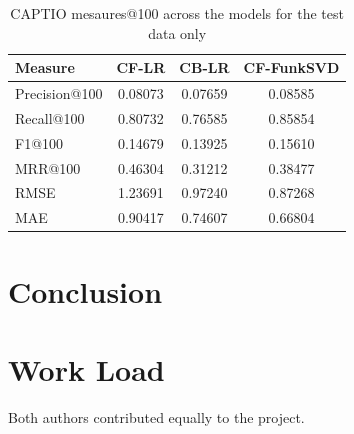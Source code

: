 \documentclass[conference]{IEEEtran}
\begin{document}
\begin{table}[H]
\centering
\caption{CAPTIO mesaures@100 across the models for the test data only}
\label{tab:atk_results_benchamarkpaper}
\begin{tabular}{lccc}
\toprule
\textbf{Measure} & \textbf{CF-LR} & \textbf{CB-LR} & \textbf{CF-FunkSVD} \\
\midrule
Precision@100 & 0.08073 & 0.07659 & 0.08585 \\
Recall@100 & 0.80732 & 0.76585 & 0.85854 \\
F1@100 & 0.14679 & 0.13925 & 0.15610 \\
MRR@100 & 0.46304 & 0.31212 & 0.38477 \\
RMSE & 1.23691 & 0.97240 & 0.87268 \\
MAE & 0.90417 & 0.74607 & 0.66804 \\
\bottomrule
\end{tabular}
\end{table}


\section{Conclusion}


\section*{Work Load}

Both authors contributed equally to the project.






\end{document}
